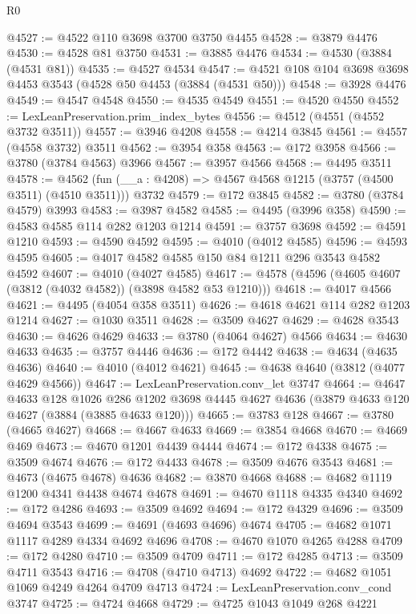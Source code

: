 \begin{lexlean}{R0}
\begin{coremodule}
@4527 := @4522 @110 @3698 @3700 @3750 @4455
@4528 := @3879 @4476
@4530 := @4528 @81 @3750
@4531 := @3885 @4476
@4534 := @4530 (@3884 (@4531 @81))
@4535 := @4527 @4534
@4547 := @4521 @108 @104 @3698 @3698 @4453 @3543 (@4528 @50 @4453 (@3884 (@4531 @50)))
@4548 := @3928 @4476
@4549 := @4547 @4548
@4550 := @4535 @4549
@4551 := @4520 @4550
@4552 := LexLeanPreservation.prim_index_bytes
@4556 := @4512 (@4551 (@4552 @3732 @3511))
@4557 := @3946 @4208
@4558 := @4214 @3845
@4561 := @4557 (@4558 @3732) @3511
@4562 := @3954 @358
@4563 := @172 @3958
@4566 := @3780 (@3784 @4563) @3966
@4567 := @3957 @4566
@4568 := @4495 @3511
@4578 := @4562 (fun (__a : @4208) => @4567 @4568 @1215 (@3757 (@4500 @3511) (@4510 @3511))) @3732
@4579 := @172 @3845
@4582 := @3780 (@3784 @4579) @3993
@4583 := @3987 @4582
@4585 := @4495 (@3996 @358)
@4590 := @4583 @4585 @114 @282 @1203 @1214
@4591 := @3757 @3698
@4592 := @4591 @1210
@4593 := @4590 @4592
@4595 := @4010 (@4012 @4585)
@4596 := @4593 @4595
@4605 := @4017 @4582 @4585 @150 @84 @1211 @296 @3543 @4582 @4592
@4607 := @4010 (@4027 @4585)
@4617 := @4578 (@4596 (@4605 @4607 (@3812 (@4032 @4582)) (@3898 @4582 @53 @1210)))
@4618 := @4017 @4566
@4621 := @4495 (@4054 @358 @3511)
@4626 := @4618 @4621 @114 @282 @1203 @1214
@4627 := @1030 @3511
@4628 := @3509 @4627
@4629 := @4628 @3543
@4630 := @4626 @4629
@4633 := @3780 (@4064 @4627) @4566
@4634 := @4630 @4633
@4635 := @3757 @4446
@4636 := @172 @4442
@4638 := @4634 (@4635 @4636)
@4640 := @4010 (@4012 @4621)
@4645 := @4638 @4640 (@3812 (@4077 @4629 @4566))
@4647 := LexLeanPreservation.conv_let @3747
@4664 := @4647
    @4633
    @128
    @1026
    @286
    @1202
    @3698
    @4445
    @4627
    @4636
    (@3879 @4633 @120 @4627 (@3884 (@3885 @4633 @120)))
@4665 := @3783 @128
@4667 := @3780 (@4665 @4627)
@4668 := @4667 @4633
@4669 := @3854 @4668
@4670 := @4669 @469
@4673 := @4670 @1201 @4439 @4444
@4674 := @172 @4338
@4675 := @3509 @4674
@4676 := @172 @4433
@4678 := @3509 @4676 @3543
@4681 := @4673 (@4675 @4678) @4636
@4682 := @3870 @4668
@4688 := @4682 @1119 @1200 @4341 @4438 @4674 @4678
@4691 := @4670 @1118 @4335 @4340
@4692 := @172 @4286
@4693 := @3509 @4692
@4694 := @172 @4329
@4696 := @3509 @4694 @3543
@4699 := @4691 (@4693 @4696) @4674
@4705 := @4682 @1071 @1117 @4289 @4334 @4692 @4696
@4708 := @4670 @1070 @4265 @4288
@4709 := @172 @4280
@4710 := @3509 @4709
@4711 := @172 @4285
@4713 := @3509 @4711 @3543
@4716 := @4708 (@4710 @4713) @4692
@4722 := @4682 @1051 @1069 @4249 @4264 @4709 @4713
@4724 := LexLeanPreservation.conv_cond @3747
@4725 := @4724 @4668
@4729 := @4725 @1043 @1049 @268 @4221

\end{coremodule}
\end{lexlean}
